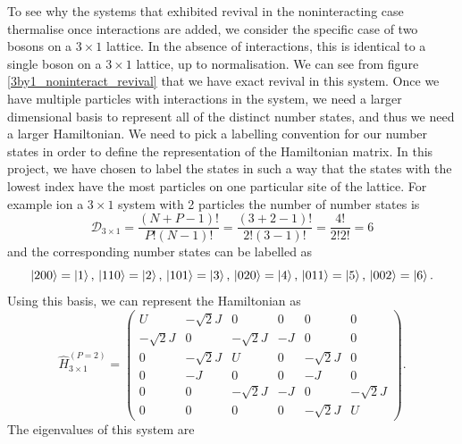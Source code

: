 \documentclass[a4paper, 10pt]{article}
\theoremstyle{plain}
\begin{document}
To see why the systems that exhibited revival in the noninteracting case
thermalise once interactions are added, we consider the specific case of
two bosons on a $3\times1$ lattice. In the absence of interactions, this
is identical to a single boson on a $3\times1$ lattice, up to normalisation.
We can see from figure \ref{3by1_noninteract_revival} that we have exact revival
in this system. Once we have multiple particles with interactions in the system,
we need a larger dimensional basis to represent all of the distinct number
states, and thus we need a larger Hamiltonian. We need to pick a labelling
convention for our number states in order to define the representation of
the Hamiltonian matrix. In this project, we have chosen to label the states
in such a way that the states with the lowest index have the most particles on
one particular site of the lattice. For example ion a $3 \times 1$ system with
2 particles the number of number states is
\begin{equation*}
    \mathcal{D}_{3 \times 1} =
    \frac{(N + P - 1)!}{P! (N-1)!} =
    \frac{(3 + 2 - 1)!}{2! (3-1)!} = \frac{4!}{2! 2!} = 6
\end{equation*}
and the corresponding number states can be labelled as
\begin{equation*}
    \ket{200} = \ket{1},\,
    \ket{110} = \ket{2},\,
    \ket{101} = \ket{3},\,
    \ket{020} = \ket{4},\,
    \ket{011} = \ket{5},\,
    \ket{002} = \ket{6}.
\end{equation*}
Using this basis, we can represent the Hamiltonian as
\begin{equation}
    \hat{H}_{3\times1}^{\left(P=2\right)}
    =
    \begin{pmatrix}
             U & -\sqrt{2}J &          0 &   0 &          0 &          0 \\
    -\sqrt{2}J &          0 & -\sqrt{2}J &  -J &          0 &          0 \\
             0 & -\sqrt{2}J &          U &   0 & -\sqrt{2}J &          0 \\
             0 &         -J &          0 &   0 &         -J &          0 \\
             0 &          0 & -\sqrt{2}J &  -J &          0 & -\sqrt{2}J \\
             0 &          0 &          0 &   0 & -\sqrt{2}J &          U
    \end{pmatrix}.
\end{equation}
The eigenvalues of this system are
\end{document}
